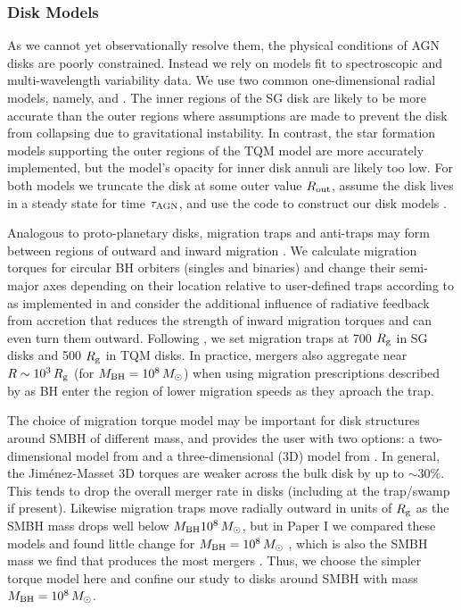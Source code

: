 \subsubsection{Disk Models}
As we cannot yet observationally resolve them, the physical conditions of AGN disks are poorly constrained.
Instead we rely on models fit to spectroscopic and multi-wavelength variability data.
We use two common one-dimensional radial models, namely, \citet[][hereafter SG]{SirkoGoodman03} and \citet[][hereafter TQM]{ThompsonQuataertMurray05}.
The inner regions of the SG disk are likely to be more accurate than the outer regions where assumptions are made to prevent the disk from collapsing due to gravitational instability.
In contrast, the star formation models supporting the outer regions of the TQM model are more accurately implemented, but the model's opacity for inner disk annuli are likely too low.
For both models we truncate the disk at some outer value $R_{\rm out}$, assume the disk lives in a steady state for time $\tau_{\rm AGN}$, and use the  code to construct our disk models \citep{Gangardt+24-pAGN}.

Analogous to proto-planetary disks, migration traps and anti-traps may form between regions of outward and inward migration \citep{Lyra+10}.
We calculate migration torques for circular BH orbiters (singles and binaries) and change their semi-major axes depending on their location relative to user-defined traps according to \citet{Paardekooper+10} as implemented in \citet{GrishinGilbaumStone24} and consider the additional influence of radiative feedback from accretion \citep{HanklaJiangArmitage20} that reduces the strength of inward migration torques and can even turn them outward.
Following \citet{Bellovary+16}, we set migration traps at 700 $R_{\rm g}$ in SG disks and 500 $R_{\rm g}$ in TQM disks.
In practice, mergers also aggregate near $R\sim10^3\,R_{\rm g}$ (for $M_{\rm BH} = 10^8\,M_{\odot}$) when using migration prescriptions described by \citet{GrishinGilbaumStone24} as BH enter the region of lower migration speeds as they aproach the trap.

The choice of migration torque model may be important for disk structures around SMBH of different mass, and  provides the user with two options: a two-dimensional model from \citet{Paardekooper+10} and a three-dimensional (3D) model from \citet{JimenezMassset17}.
In general, the Jim\'enez-Masset 3D torques are weaker across the bulk disk by up to $\sim$30\%.
This tends to drop the overall merger rate in disks (including at the trap/swamp if present).
Likewise migration traps move radially outward in units of $R_{\rm g}$ as the SMBH mass drops well below $M_{\rm BH} 10^8\,M_{\odot}$, but in Paper I we compared these models and found little change for $M_{\rm BH} = 10^8\,M_{\odot}$ \citep[see Fig. 6 \& 7 of][]{McKernan+25-mcfactsI}, which is also the SMBH mass we find that produces the most mergers \citep{Delfavero+25-mcfactsIII}.
Thus, we choose the simpler \citet{Paardekooper+10} torque model here and confine our study to disks around SMBH with mass $M_{\rm BH} = 10^8\,M_{\odot}$.

